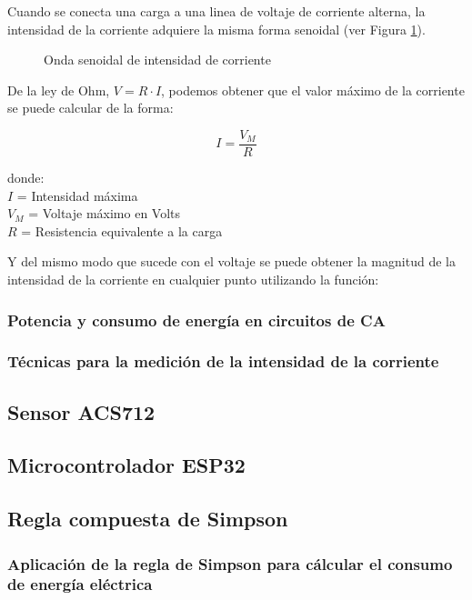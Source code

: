 Cuando se conecta una carga a una linea de voltaje de corriente alterna, la intensidad de la corriente adquiere la misma forma senoidal (ver Figura \ref{fig:senoidal-corriente}).

\begin{figure}[h!]
    \centering
    \caption{Onda senoidal de intensidad de corriente}
    \label{fig:senoidal-corriente}
\end{figure}

De la ley de Ohm, $V = R \cdotp I$, podemos obtener que el valor máximo de la corriente se puede calcular de la forma:

\[
  I = \frac{V_{M} }{R}
\]

donde:\\
\(I\) = Intensidad máxima\\
\(V_M\) = Voltaje máximo en Volts \\
\(R\) = Resistencia equivalente a la carga

Y del mismo modo que sucede con el voltaje se puede obtener la magnitud de la intensidad de la corriente en cualquier punto utilizando la función:


\subsubsection{Potencia y consumo de energía en circuitos de CA}

\subsubsection{Técnicas para la medición de la intensidad de la corriente}

\subsection{Sensor ACS712}
\label{sec:sensor-acs712}

\subsection{Microcontrolador ESP32}
\label{sec:micr-esp32}

\subsection{Regla compuesta de Simpson}
\label{sec:regla-compuesta-de}

\subsubsection{Aplicación de la regla de Simpson para cálcular el consumo de energía eléctrica}
